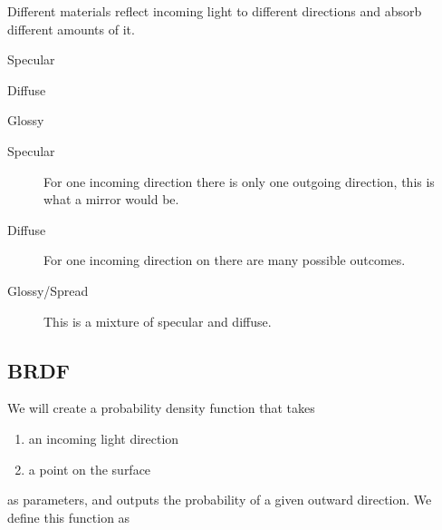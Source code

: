 \documentclass[10pt]{armath}
\numberwithin{equation}{section}
\newenvironment{Figure}
{\par\medskip\noindent\minipage{\linewidth}}
{\endminipage\par\medskip}
\theoremstyle{definition}
\begin{document}
\begin{multicols}{2}
Different materials reflect incoming light to different directions and absorb
different amounts of it.

\begin{Figure}
  \begin{center}
    \centering
    \begin{minipage}{0.3\textwidth}
      \begin{center}
        
        Specular
      \end{center}
    \end{minipage}
    \begin{minipage}{0.3\textwidth}
      \begin{center}
        
        Diffuse
      \end{center}
    \end{minipage}
    \begin{minipage}{0.3\textwidth}
      \begin{center}
        
        Glossy
      \end{center}
    \end{minipage}
  \end{center}
  \label{fig:03_1}
\end{Figure}


\begin{description}
  \item[Specular] For one incoming direction there is only one outgoing
    direction, this is what a mirror would be.
  \item[Diffuse] For one incoming direction on there are many possible
    outcomes.
  \item[Glossy/Spread] This is a mixture of specular and diffuse.
\end{description}

\subsection{BRDF}%
\label{sub:brdf}

We will create a probability density function that takes
\begin{enumerate}
  \item an incoming light direction
  \item a point on the surface
\end{enumerate}
as parameters, and outputs the probability of a given outward direction. We
define this function as


\end{multicols}
\end{document}
